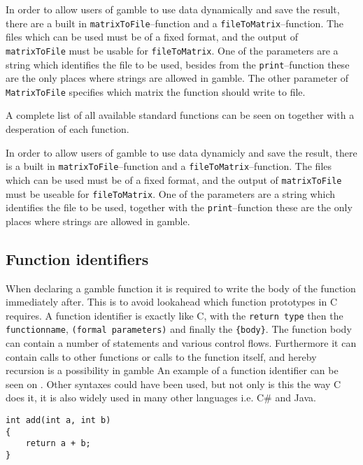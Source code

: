 In order to allow users of \gls{gamble} to use data dynamically and save the result, there are a built in \texttt{matrixToFile}--function and a \texttt{fileToMatrix}--function. 
The files which can be used must be of a fixed format, and the output of \texttt{matrixToFile} must be usable for \texttt{fileToMatrix}.
One of the parameters are a string which identifies the file to be used, besides from the \texttt{print}--function these are the only places where strings are allowed in \gls{gamble}.
The other parameter of \texttt{MatrixToFile} specifies which matrix the function should write to file.

A complete list of all available standard functions can be seen on  together with a desperation of each function.


In order to allow users of \gls{gamble} to use data dynamicly and save the result, there is a built in \texttt{matrixToFile}--function and a \texttt{fileToMatrix}--function. 
The files which can be used must be of a fixed format, and the output of \texttt{matrixToFile} must be useable for \texttt{fileToMatrix}.
One of the parameters are a string which identifies the file to be used, together with the \texttt{print}--function these are the only places where strings are allowed in \gls{gamble}.

\subsection*{Function identifiers}
When declaring a \gls{gamble} function it is required to write the body of the function immediately after.
This is to avoid lookahead which function prototypes in C requires.
A function identifier is exactly like C, with the \texttt{return type} then the \texttt{functionname}, \texttt{(formal parameters)} and finally the \texttt{\{body\}}. %
The function body can contain a number of statements and various control flows.
Furthermore it can contain calls to other functions or calls to the function itself, and hereby recursion is a possibility in \gls{gamble}
An example of a function identifier can be seen on .
Other syntaxes could have been used, but not only is this the way C does it, it is also widely used in many other languages i.e. C\# and Java.

\begin{lstlisting}[caption={Function Identifier},label={lst:functionID},numbers=none]                                                        
int add(int a, int b)
{
    return a + b;
}
\end{lstlisting}

